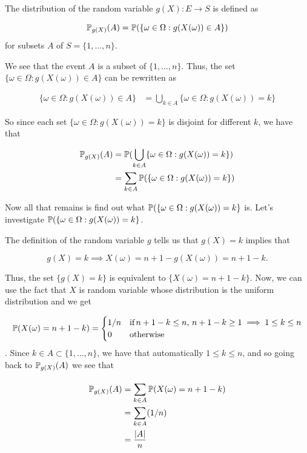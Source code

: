 
The distribution of the random variable $ g(X): E \to S$ is defined as 

\[
    \P_{g(X)} (A) = \P ( \{ \omega \in \Omega: g(X(\omega)) \in A \} )
\] 
for subsets $ A$ of $ S = \{ 1,\dots,n \} $.

We see that the event $ A$ is a subset of $ \{ 1,\dots, n \} $. Thus, the set 
$\{ \omega \in \Omega: g(X(\omega)) \in A \}  $  can be rewritten as 

\begin{align*}
    \{ \omega \in \Omega: g(X(\omega)) \in A \} &= \bigcup_{k \in A} \{ \omega \in \Omega: g(X(\omega))
= k\}
\end{align*}

So since each set $ \{ \omega \in \Omega: g(X(\omega)) = k \} $ is disjoint for different $ k$,
we have that

\begin{align*}
    \P_{g(X)} (A) &= \P(\bigcup_{k \in A} \{ \omega \in \Omega: g(X(\omega)) = k\})\\
		  &= \sum_{k \in A} \P( \{ \omega \in \Omega: g(X(\omega)) = k \} )
\end{align*}

Now all that remains is find out what $ \P( \{ \omega \in \Omega: g(X(\omega)) = k \} $ is.
Let's investigate $ \P( \{ \omega \in \Omega: g(X(\omega)) = k \} $. 

The definition of the random variable $ g$ tells us that $ g(X) = k $ implies that

\[
    g(X) = k \implies X(\omega) = n+1 - g(X(\omega)) = n+1 -k
.\] 

Thus, the set $ \{ g(X) = k \} $ is equivalent to $ \{ X(\omega) = n+1-k \} $.
Now, we can use the fact that $ X$ is random variable whose distribution is the uniform
distribution and we get

\begin{align*}
    \P (X(\omega) = n+1-k) = 
    \begin{cases}
	1/n & \mbox{if} \, n+1 -k \leq n, \, n+1-k \geq 1 \implies  1 \leq k \leq n\\
	0 & \mbox{otherwise} 
    \end{cases}
\end{align*}
.
Since $ k \in A \subset \{ 1,\dots, n \} $, we have that automatically $ 1\leq k \leq n$, and so
going back to $ \P_{g(X)} (A)$ we see that

\begin{align*}
    \P_{g(X)} (A) &= \sum_{k\in A}^{} \P(X(\omega) = n+1-k)\\
		  &= \sum_{k \in A} (1/n)\\
		  &= \frac{|A|}{n} 
\end{align*}


